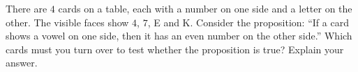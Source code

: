 There are $4$ cards on a table, each with a number on one side and a letter on the other. The visible faces show $4$, $7$, E and K. Consider the proposition: ``If a card shows a vowel on one side, then it has an even number on the other side.'' Which cards must you turn over to test whether the proposition is true? Explain your answer.
